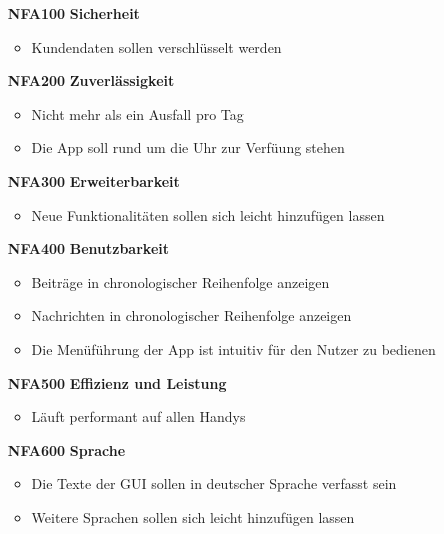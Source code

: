 \documentclass[parskip=full]{scrartcl}
\begin{document}
			\begin{itemize} 
				\item[\textbf{NFA100}] \textbf{Sicherheit} \label{sec:NFA100}
					\begin{itemize}[nosep]
						\item Kundendaten sollen verschlüsselt werden
					\end{itemize}
				\item[\textbf{NFA200}] \textbf{Zuverlässigkeit} \label{sec:NFA200}
					\begin{itemize}[nosep]
						\item Nicht mehr als ein Ausfall pro Tag
						\item Die App soll rund um die Uhr zur Verfüung stehen
					\end{itemize}
				\item[\textbf{NFA300}] \textbf{Erweiterbarkeit} \label{sec:NFA300}
					\begin{itemize}[nosep]
						\item Neue Funktionalitäten sollen sich leicht hinzufügen lassen
					\end{itemize}
				\item[\textbf{NFA400}] \textbf{Benutzbarkeit} \label{sec:NFA400}
					\begin{itemize}[nosep]
						\item Beiträge in chronologischer Reihenfolge anzeigen
						\item Nachrichten in chronologischer Reihenfolge anzeigen
						\item 	Die Menüführung der App ist intuitiv für den Nutzer zu bedienen
					\end{itemize}
				\item[\textbf{NFA500}] \textbf{Effizienz und Leistung} \label{sec:NFA500}
					\begin{itemize}[nosep]
						\item Läuft performant auf allen Handys
					\end{itemize}
				\item[\textbf{NFA600}] \textbf{Sprache} \label{sec:NFA600}
					\begin{itemize}[nosep]
						\item Die Texte der GUI sollen in deutscher Sprache verfasst sein
						\item Weitere Sprachen sollen sich leicht hinzufügen lassen
					\end{itemize}
			\end{itemize}	
	
	\newpage
\end{document}

